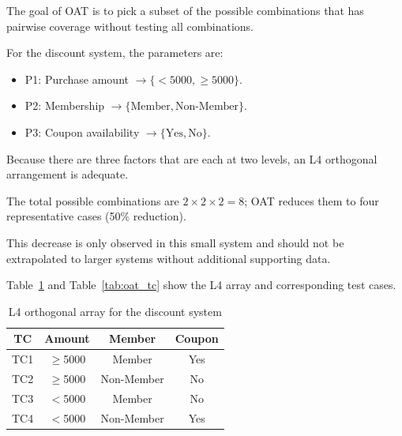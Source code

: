 \documentclass[conference]{IEEEtran}
\begin{document}
The goal of OAT is to pick a subset of the possible combinations that has pairwise coverage without testing all combinations.



For the discount system, the parameters are:

\begin{itemize}

\item P1: Purchase amount $\to \{<5000, \geq 5000\}$.

\item P2: Membership $\to \{\text{Member}, \text{Non-Member}\}$.

\item P3: Coupon availability $\to \{\text{Yes}, \text{No}\}$.

\end{itemize}



Because there are three factors that are each at two levels, an L4 orthogonal arrangement is adequate.

The total possible combinations are $2 \times 2 \times 2 = 8$; OAT reduces them to four representative cases (50\% reduction).

This decrease is only observed in this small system and should not be extrapolated to larger systems without additional supporting data.



Table~\ref{tab:oat_array} and Table~\ref{tab:oat_tc} show the L4 array and corresponding test cases.



\begin{table}[!t]

\centering

\caption{L4 orthogonal array for the discount system}

\label{tab:oat_array}

\begin{tabular}{|c|c|c|c|}
\hline
\textbf{TC} & \textbf{Amount} & \textbf{Member} & \textbf{Coupon} \\
\hline
TC1 & $\geq$5000 & Member & Yes \\
TC2 & $\geq$5000 & Non-Member & No \\
TC3 & $<$5000 & Member & No \\
TC4 & $<$5000 & Non-Member & Yes \\
\hline
\end{tabular}

\end{table}
\end{document}
